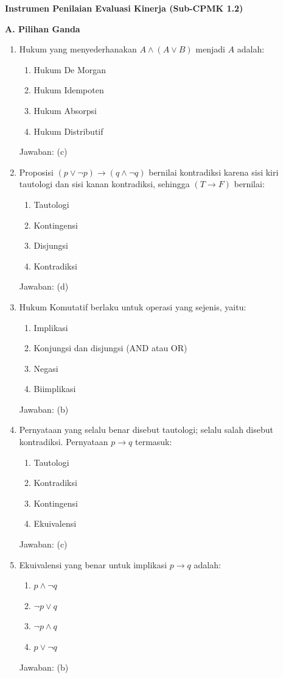 \documentclass[../main]{subfiles}
\begin{document}
\begin{asesmen}
\textbf{Instrumen Penilaian Evaluasi Kinerja (Sub-CPMK 1.2)}

\textbf{A. Pilihan Ganda}
\begin{enumerate}
  \item Hukum yang menyederhanakan $A \wedge (A \vee B)$ menjadi $A$ adalah:
  \begin{enumerate}
    \item Hukum De Morgan
    \item Hukum Idempoten
    \item Hukum Absorpsi
    \item Hukum Distributif
  \end{enumerate}
  Jawaban: (c)

  \item Proposisi $(p \vee \neg p) \rightarrow (q \wedge \neg q)$ bernilai kontradiksi karena sisi kiri tautologi dan sisi kanan kontradiksi, sehingga $(T \rightarrow F)$ bernilai:
  \begin{enumerate}
    \item Tautologi
    \item Kontingensi
    \item Disjungsi
    \item Kontradiksi
  \end{enumerate}
  Jawaban: (d)

  \item Hukum Komutatif berlaku untuk operasi yang sejenis, yaitu:
  \begin{enumerate}
    \item Implikasi
    \item Konjungsi dan disjungsi (AND atau OR)
    \item Negasi
    \item Biimplikasi
  \end{enumerate}
  Jawaban: (b)

  \item Pernyataan yang selalu benar disebut tautologi; selalu salah disebut kontradiksi. Pernyataan $p \rightarrow q$ termasuk:
  \begin{enumerate}
    \item Tautologi
    \item Kontradiksi
    \item Kontingensi
    \item Ekuivalensi
  \end{enumerate}
  Jawaban: (c)

  \item Ekuivalensi yang benar untuk implikasi $p \rightarrow q$ adalah:
  \begin{enumerate}
    \item $p \wedge \neg q$
    \item $\neg p \vee q$
    \item $\neg p \wedge q$
    \item $p \vee \neg q$
  \end{enumerate}
  Jawaban: (b)


\end{enumerate}
\end{asesmen}
\end{document}
